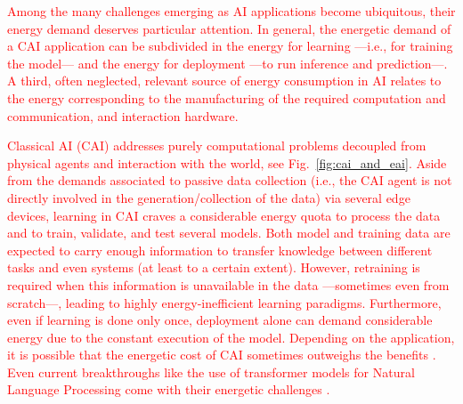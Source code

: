 \documentclass[12pt]{article}
\newcommand\myhl[1]{\textcolor{red}{#1}}
\begin{document}
\myhl{Among the many challenges emerging as AI applications become ubiquitous, their energy demand deserves particular attention. In general, the energetic demand of a CAI application can be subdivided in the energy for learning ---i.e., for training the model--- and the energy for deployment ---to run inference and prediction---. A third, often neglected, relevant source of energy consumption in AI relates to the energy corresponding to the manufacturing of the required computation and communication, and interaction hardware.} 
	
\myhl{Classical AI (CAI) addresses purely computational problems decoupled from physical agents and interaction with the world, see Fig.~\ref{fig:cai_and_eai}. Aside from the demands associated to passive data collection (i.e., the CAI agent is not directly involved in the generation/collection of the data) via several edge devices, learning in CAI craves a considerable energy quota to process the data and to train, validate, and test several models. Both model and training data are expected to carry enough information to transfer knowledge between different tasks and even systems (at least to a certain extent). However, retraining is required when this information is unavailable in the data ---sometimes even from scratch---, leading to highly energy-inefficient learning paradigms. Furthermore, even if learning is done only once, deployment alone can demand considerable energy due to the constant execution of the model.  Depending on the application, it is possible that the energetic cost of CAI sometimes outweighs the benefits \cite{Strubell2019EnergyPolicyConsiderations}. Even current breakthroughs like the use of transformer models for Natural Language Processing come with their energetic challenges \cite{Cao2020TowardsAccurateReliable}.}
\end{document}
